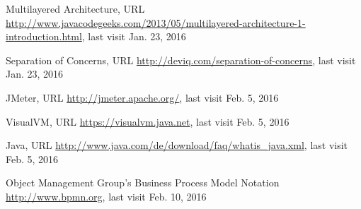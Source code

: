 \begin{thebibliography}{99}
 Multilayered Architecture, URL
\url{http://www.javacodegeeks.com/2013/05/multilayered-architecture-1-introduction.html}, last visit Jan. 23, 2016

 Separation of Concerns, URL
\url{http://deviq.com/separation-of-concerns}, last visit Jan. 23, 2016

 JMeter, URL
\url{http://jmeter.apache.org/}, last visit Feb. 5, 2016

 VisualVM, URL
\url{https://visualvm.java.net}, last visit Feb. 5, 2016

 Java, URL
\url{http://www.java.com/de/download/faq/whatis_java.xml}, last visit Feb. 5, 2016

 Object Management Group's Business Process Model Notation
\url{http://www.bpmn.org}, last visit Feb. 10, 2016





\end{thebibliography}
